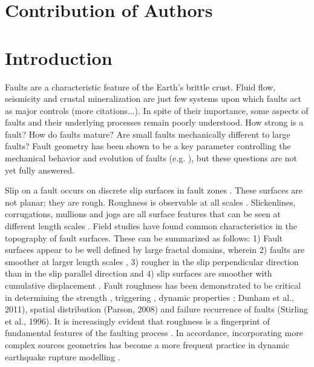 \documentclass[12pt,a4paper]{article}
\begin{document}
\section*{Contribution of Authors}

\section{Introduction}

Faults are a characteristic feature of the Earth’s brittle crust. Fluid flow, seismicity and crustal mineralization are just few systems upon which faults act as major controls \cite{sibson1977fault} (more citations...). In spite of their importance, some aspects of faults and their underlying processes remain poorly understood. How strong is a fault? How do faults mature? Are small faults mechanically different to large faults? Fault geometry has been shown to be a key parameter controlling the mechanical behavior and evolution of faults (e.g. \cite{lay1982asperity} \cite{aki1984asperities} \cite{power1988roughness} \cite{chester2000stress}), but these questions are not yet fully answered.

Slip on a fault occurs on discrete slip surfaces in fault zones \cite{davatzes2005distribution}. These surfaces are not planar; they are rough. Roughness is observable at all scales \cite{scholz1986fractal} \cite{candela2011fault}. Slickenlines, corrugations, mullions and jogs are all  surface features that can be seen at different length scales \cite{sagy2009geometric}. Field studies have found common characteristics in the topography of fault surfaces. These can be summarized as follows: 1) Fault surfaces appear to be well defined by large fractal domains, wherein 2) faults are smoother at larger length scales \cite{scholz1986fractal} \cite{candela2011fault}, 3) rougher in the slip perpendicular direction than in the slip parallel direction \cite{lee1996structural} and 4) slip surfaces are smoother with cumulative displacement \cite{sagy2007geometric}\cite{brodsky2011faults}. Fault roughness has been demonstrated to be critical in determining the strength \cite{chester2000stress} \cite{brodsky2016constraints}, triggering \cite{parsons2008persistent}, dynamic properties \cite{candela2011stress}; Dunham et al., 2011), spatial distribution (Parson, 2008) and failure recurrence of faults (Stirling et al., 1996). It is increasingly evident that roughness is a fingerprint of fundamental features of the faulting process \cite{brodsky2016constraints} \cite{candela2011stress}. In accordance, incorporating more complex sources geometries has become a more frequent practice in dynamic earthquake rupture modelling \cite{shi2013rupture} . 
\end{document}
